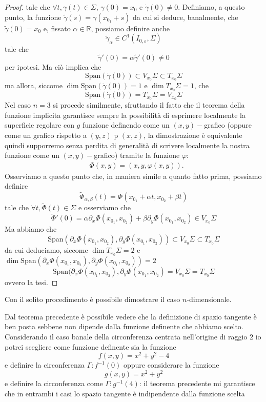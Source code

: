 \begin{proof}
tale che $\forall t, \gamma(t) \in \Sigma$, $\gamma(0) = x_0$ e $\dot{\gamma}(0) \neq 0$. Definiamo, a questo punto, la funzione $\tilde{\gamma}(s) = \gamma(x_{0_1} + s)$ da cui si deduce, banalmente, che $\tilde{\gamma}(0) = x_0$ e, fissato $\alpha \in \mathbb{R}$, possiamo definire anche
$$
\tilde{\gamma}_\alpha \in C^{1}(I_{0, \varepsilon}, \Sigma)
$$
tale che
$$
\tilde{\gamma}'(0) = \alpha \tilde{\gamma}'(0) \neq 0 
$$
per ipotesi. Ma ciò implica che
$$
\text{Span}(\dot{\gamma}(0)) \subset V_{x_0} \Sigma \subset T_{x_0} \Sigma
$$
ma allora, siccome $\dim{\text{Span}(\dot{\gamma}(0))} = 1$ e $\dim{T_{x_0} \Sigma} = 1$, che
$$
\text{Span}(\dot{\gamma}(0)) = T_{x_0} \Sigma = V_{x_0} \Sigma
$$
Nel caso $n=3$ si procede similmente, sfruttando il fatto che il teorema della funzione implicita garantisce sempre la possibilità di esprimere localmente la superficie regolare con $g$ funzione definendo come un $(x, y)-$grafico (oppure come un grafico rispetto a $(y, z)$ p $(x, z)$, la dimostrazione è equivalente quindi supporremo senza perdita di generalità di scrivere localmente la nostra funzione come un $(x, y)-$grafico) tramite la funzione $\varphi$:
\begin{align*}
&\Phi(x, y) = (x, y, \varphi(x, y)).
\end{align*}
Osserviamo a questo punto che, in maniera simile a quanto fatto prima, possiamo definire
$$
\tilde{\Phi}_{\alpha, \beta}(t) = \Phi(x_{0_1} + \alpha t, x_{0_2} + \beta t)
$$
tale che $\forall t, \tilde{\Phi}(t) \in \Sigma$ e osserviamo che
$$
\tilde{\Phi}'(0) = \alpha \partial_x \Phi(x_{0_1}, x_{0_2}) + \beta \partial_y \Phi(x_{0_1}, x_{0_2}) \in V_{x_0} \Sigma
$$
Ma abbiamo che 
$$
\text{Span}(\partial_x \Phi(x_{0_1}, x_{0_2}), \partial_y \Phi(x_{0_1}, x_{0_2})) \subset V_{x_0} \Sigma \subset T_{x_0} \Sigma
$$
da cui deduciamo, siccome $\dim{T_{x_0} \Sigma} = 2$ e $\dim{\text{Span}(\partial_{x} \Phi(x_{0_1}, x_{0_2}), \partial_y \Phi(x_{0_1}, x_{0_2}))} = 2$
$$
	\text{Span}(\partial_x \Phi(x_{0_1}, x_{0_2}), \partial_y \Phi(x_{0_1}, x_{0_2}) = V_{x_0} \Sigma = T_{x_0} \Sigma
$$
ovvero la tesi.
\end{proof}
\begin{remark}
Con il solito procedimento è possibile dimostrare il caso $n$-dimensionale.
\end{remark}
\begin{remark}
Dal teorema precedente è possibile vedere che la definizione di spazio tangente è ben posta sebbene non dipende dalla funzione definente che abbiamo scelto. Considerando il caso banale della circonferenza centrata nell'origine di raggio $2$ io potrei scegliere come funzione definente sia la funzione
$$
f(x, y) = x^2 + y^2 - 4
$$
e definire la circonferenza $\Gamma: f^{-1}(0)$ oppure considerare la funzione
$$
g(x, y) = x^2 + y^2
$$
e definire la circonferenza come $\Gamma: g^{-1}(4)$: il teorema precedente mi garantisce che in entrambi i casi lo spazio tangente è indipendente dalla funzione scelta
\end{remark}



